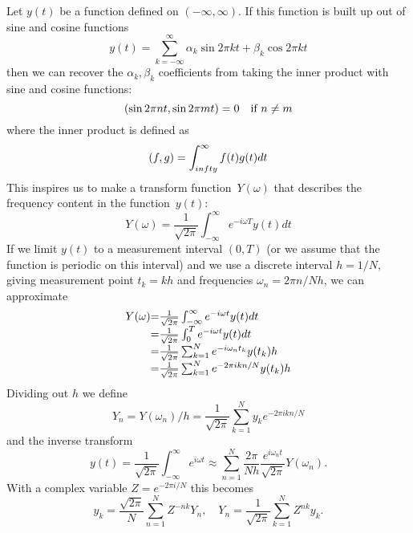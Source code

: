 
Let $y(t)$ be a function defined on $(-\infty,\infty)$. If this
function is built up out of sine and cosine functions
\[ y(t) = \sum_{k=-\infty}^\infty \alpha_k \sin 2\pi kt
                + \beta_k \cos 2\pi kt
\] 
then we can recover the $\alpha_k,\beta_k$ coefficients from taking
the inner product with sine and cosine functions:
\[ (\sin 2\pi nt,\sin 2\pi mt)=0 \quad \hbox{if $n\not=m$} \]
where the inner product is defined as
\[ (f,g) = \int_{\-infty}^\infty f(t)g(t)dt \]
This inspires us to make a transform function~$Y(\omega)$ that
describes the frequency content in the function~$y(t)$:
\[ Y(\omega) = \frac 1{\sqrt{2\pi}}
    \int_{-\infty}^\infty e^{-i\omega T} y(t) dt
\]
If we limit $y(t)$ to a measurement interval $(0,T)$ (or we assume
that the function is periodic on this interval) and we use a discrete
interval $h=1/N$, giving measurement point $t_k=kh$ and frequencies
$\omega_n = 2\pi n/Nh$,
we can approximate
\[ 
\begin{array}{r@{=}l}
  Y(\omega) 
  & \frac 1{\sqrt{2\pi}} \int_{-\infty}^\infty e^{-i\omega t} y(t) dt\\
  & \frac 1{\sqrt{2\pi}} \int_0^T e^{-i\omega t} y(t) dt\\
  & \frac 1{\sqrt{2\pi}} \sum_{k=1}^N  e^{-i\omega_nt_k} y(t_k) h\\
  & \frac 1{\sqrt{2\pi}} \sum_{k=1}^N  e^{-2\pi ikn/N} y(t_k) h\\
\end{array}
\]
Dividing out $h$ we define
\[ Y_n = Y(\omega_n)/h = \frac1{\sqrt{2\pi}} 
        \sum_{k=1}^N y_k e^{-2\pi ikn/N}
\]
and the inverse transform
\[ y(t) = \frac1{\sqrt{2\pi}} \int_{-\infty}^\infty e^{i\omega t}
    \approx \sum_{n=1}^N \frac{2\pi}{Nh} \frac{e^{i\omega_n
        t}}{\sqrt{2\pi}}
    Y(\omega_n).
\]
With a complex variable $Z=e^{-2\pi i/N}$ this becomes
\[ y_k = \frac{\sqrt{2\pi}}N \sum_{n=1}^N Z^{-nk} Y_n, \quad
    Y_n = \frac1{\sqrt{2\pi}} \sum_{k=1}^N Z^{nk} y_k.
\]

